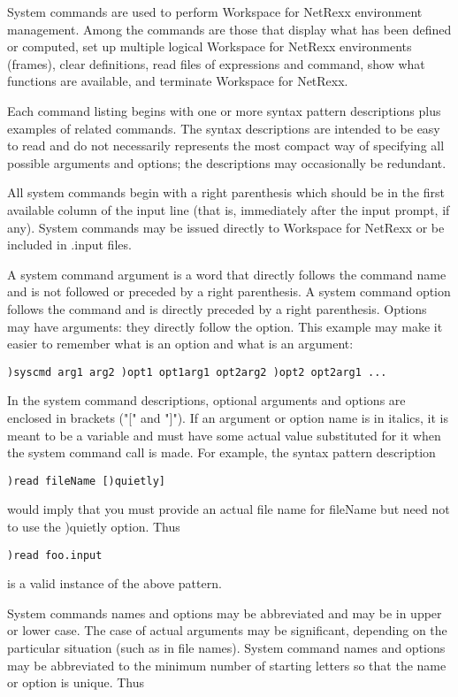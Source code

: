 System commands are used to perform Workspace for NetRexx environment management. Among the commands are those that display what has been defined or computed, set up multiple logical Workspace for NetRexx environments (frames), clear definitions, read files of expressions and command, show what functions are available, and terminate Workspace for NetRexx.

Each command listing begins with one or more syntax pattern descriptions plus examples of related commands. The syntax descriptions are intended to be easy to read and do not necessarily represents the most compact way of specifying all possible arguments and options; the descriptions may occasionally be redundant.

All system commands begin with a right parenthesis which should be in the first available column of the input line (that is, immediately after the input prompt, if any). System commands may be issued directly to Workspace for NetRexx or be included in .input files.

A system command argument is a word that directly follows the command name and is not followed or preceded by a right parenthesis. A system command option follows the command and is directly preceded by a right parenthesis. Options may have arguments: they directly follow the option. This example may make it easier to remember what is an option and what is an argument:
\begin{verbatim}
)syscmd arg1 arg2 )opt1 opt1arg1 opt2arg2 )opt2 opt2arg1 ...
\end{verbatim}
In the system command descriptions, optional arguments and options are enclosed in brackets ("[" and "]"). If an argument or option name is in italics, it is meant to be a variable and must have some actual value substituted for it when the system command call is made. For example, the syntax pattern description
\begin{verbatim}
)read fileName [)quietly]
\end{verbatim}
would imply that you must provide an actual file name for fileName but need not to use the )quietly option. Thus

\begin{verbatim}
)read foo.input
\end{verbatim}
is a valid instance of the above pattern.

System commands names and options may be abbreviated and may be in upper or lower case. The case of actual arguments may be significant, depending on the particular situation (such as in file names). System command names and options may be abbreviated to the minimum number of starting letters so that the name or option is unique. Thus

